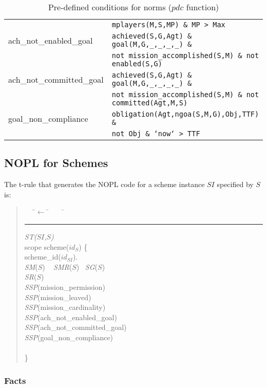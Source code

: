 \documentclass{article}
\newcommand{\code}[1]{\texttt{#1}}
\newenvironment{rwrule}[2]
{\begin{quote}\ttfamily\begin{tabbing}~~~\=$\leftarrow$ \= ~~~ \= \kill
     \ensuremath{#2}\\
     \rule[2pt]{6.5cm}{.3pt} \hfill \rwlabel{#1}\\}
{\end{tabbing}\end{quote}}
\newcommand{\rwlabel}[1]{{\scshape\itshape\textrm{#1}}}
\theoremstyle{definition} \newtheorem{definition}{Definition}
\begin{document}
\begin{table}[t]
{\begin{tabular}{l l}
                 & \code{mplayers(M,S,MP) \& MP > Max}\\
      ach\_not\_enabled\_goal &  \code{achieved(S,G,Agt) \& goal(M,G,\_,\_,\_,\_) \&}\\
                 & \code{not mission\_accomplished(S,M) \& not enabled(S,G)} \\
      ach\_not\_committed\_goal & \code{achieved(S,G,Agt) \& goal(M,G,\_,\_,\_,\_) \&}\\
                 & \code{not mission\_accomplished(S,M) \& not committed(Agt,M,S)} \\
     goal\_non\_compliance & \code{obligation(Agt,ngoa(S,M,G),Obj,TTF) \&}\\
                    & \code{not Obj \& `now` > TTF}\\
     \bottomrule
   \end{tabular}
   }
   \caption{Pre-defined conditions for norms ($pdc$ function)\label{tab:predefcond}}
\end{table}


\subsection{NOPL for Schemes}


The t-rule that generates the NOPL code for a scheme instance $SI$ specified by $S$ is:
\begin{rwrule}{ST($SI$,$S$)}
{}
scope scheme($id_S$) \{ \\
\> scheme\_id($id_{SI}$).\\
\> \rwlabel{SM}($S$) ~ \rwlabel{SMR}($S$) ~\rwlabel{SG}($S$) ~ \\
\> \rwlabel{SR}($S$) \\
\> \rwlabel{SSP}(mission\_permission) \\
\> \rwlabel{SSP}(mission\_leaved) \\
\> \rwlabel{SSP}(mission\_cardinality) \\
\> \rwlabel{SSP}(ach\_not\_enabled\_goal) \\
\> \rwlabel{SSP}(ach\_not\_committed\_goal) \\
\> \rwlabel{SSP}(goal\_non\_compliance) \\
\>\rwlabel{NS}\\
\}
\end{rwrule}

\subsubsection{Facts} 
\end{document}
